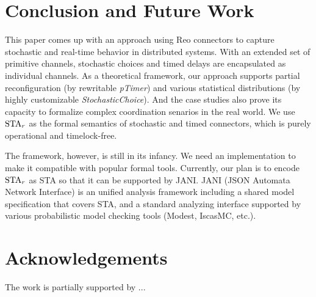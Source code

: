 \section{Conclusion and Future Work}
\label{sec:conclusion}

This paper comes up with an approach using Reo connectors to capture stochastic and real-time behavior in distributed systems. With an extended set of primitive channels, stochastic choices and timed delays are encapsulated as individual channels. As a theoretical framework, our approach supports partial reconfiguration (by rewritable \emph{pTimer}) and various statistical distributions (by highly customizable \emph{StochasticChoice}). And the case studies also prove its capacity to formalize complex coordination senarios in the real world. We use $\mbox{STA}_r$ as the formal semantics of stochastic and timed connectors, which is purely operational and timelock-free.

The framework, however, is still in its infancy. We need an implementation to make it compatible with popular formal tools. Currently, our plan is to encode $\mbox{STA}_r$ as STA so that it can be supported by JANI. JANI (JSON Automata Network Interface) \cite{JaniSpec} is an unified analysis framework including a shared model specification that covers STA, and a standard analyzing interface supported by various probabilistic model checking tools (Modest\cite{Hartmanns12}, IscasMC\cite{HahnYiFM14}, etc.).


\section*{Acknowledgements}
The work is partially supported by ...